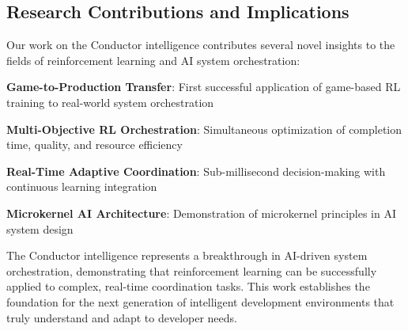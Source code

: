 \subsection*{Research Contributions and Implications}

Our work on the Conductor intelligence contributes several novel insights to the fields of reinforcement learning and AI system orchestration:

\begin{expandedlist}
    \item \textbf{Game-to-Production Transfer}: First successful application of game-based RL training to real-world system orchestration
    \item \textbf{Multi-Objective RL Orchestration}: Simultaneous optimization of completion time, quality, and resource efficiency
    \item \textbf{Real-Time Adaptive Coordination}: Sub-millisecond decision-making with continuous learning integration
    \item \textbf{Microkernel AI Architecture}: Demonstration of microkernel principles in AI system design
\end{expandedlist}

The Conductor intelligence represents a breakthrough in AI-driven system orchestration, demonstrating that reinforcement learning can be successfully applied to complex, real-time coordination tasks. This work establishes the foundation for the next generation of intelligent development environments that truly understand and adapt to developer needs.
